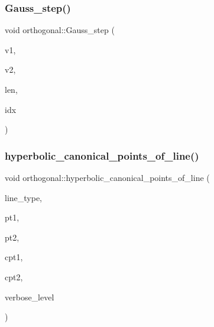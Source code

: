 \mbox{\label{classorthogonal_acc98650297e4c16a55f881780df18ff1}} 
\subsubsection{\texorpdfstring{Gauss\+\_\+step()}{Gauss\_step()}}
{\footnotesize\ttfamily void orthogonal\+::\+Gauss\+\_\+step (\begin{DoxyParamCaption}\item[{\mbox{\hyperlink{galois_8h_a09fddde158a3a20bd2dcadb609de11dc}{I\+NT}} $\ast$}]{v1,  }\item[{\mbox{\hyperlink{galois_8h_a09fddde158a3a20bd2dcadb609de11dc}{I\+NT}} $\ast$}]{v2,  }\item[{\mbox{\hyperlink{galois_8h_a09fddde158a3a20bd2dcadb609de11dc}{I\+NT}}}]{len,  }\item[{\mbox{\hyperlink{galois_8h_a09fddde158a3a20bd2dcadb609de11dc}{I\+NT}}}]{idx }\end{DoxyParamCaption})}

\mbox{\label{classorthogonal_ac97ccc62702881408e916f099ec04a3e}} 
\subsubsection{\texorpdfstring{hyperbolic\+\_\+canonical\+\_\+points\+\_\+of\+\_\+line()}{hyperbolic\_canonical\_points\_of\_line()}}
{\footnotesize\ttfamily void orthogonal\+::hyperbolic\+\_\+canonical\+\_\+points\+\_\+of\+\_\+line (\begin{DoxyParamCaption}\item[{\mbox{\hyperlink{galois_8h_a09fddde158a3a20bd2dcadb609de11dc}{I\+NT}}}]{line\+\_\+type,  }\item[{\mbox{\hyperlink{galois_8h_a09fddde158a3a20bd2dcadb609de11dc}{I\+NT}}}]{pt1,  }\item[{\mbox{\hyperlink{galois_8h_a09fddde158a3a20bd2dcadb609de11dc}{I\+NT}}}]{pt2,  }\item[{\mbox{\hyperlink{galois_8h_a09fddde158a3a20bd2dcadb609de11dc}{I\+NT}} \&}]{cpt1,  }\item[{\mbox{\hyperlink{galois_8h_a09fddde158a3a20bd2dcadb609de11dc}{I\+NT}} \&}]{cpt2,  }\item[{\mbox{\hyperlink{galois_8h_a09fddde158a3a20bd2dcadb609de11dc}{I\+NT}}}]{verbose\+\_\+level }\end{DoxyParamCaption})}

